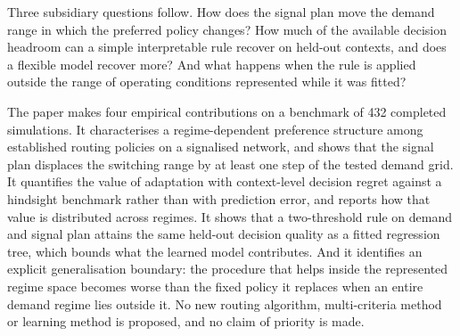 \documentclass[runningheads]{llncs}
\begin{document}
Three subsidiary questions follow. How does the signal plan move the demand range in
which the preferred policy changes? How much of the available decision headroom can a
simple interpretable rule recover on held-out contexts, and does a flexible model
recover more? And what happens when the rule is applied outside the range of operating
conditions represented while it was fitted?

The paper makes four empirical contributions on a benchmark of 432 completed
simulations. It characterises a regime-dependent preference structure among established
routing policies on a signalised network, and shows that the signal plan displaces the
switching range by at least one step of the tested demand grid. It quantifies the value
of adaptation with context-level decision regret against a hindsight benchmark rather
than with prediction error, and reports how that value is distributed across regimes. It
shows that a two-threshold rule on demand and signal plan attains the same held-out
decision quality as a fitted regression tree, which bounds what the learned model
contributes. And it identifies an explicit generalisation boundary: the procedure that
helps inside the represented regime space becomes worse than the fixed policy it
replaces when an entire demand regime lies outside it. No new routing algorithm,
multi-criteria method or learning method is proposed, and no claim of priority is
made.
\end{document}
